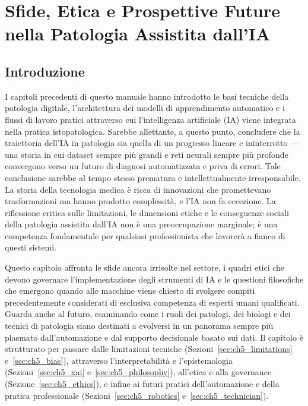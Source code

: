 
\chapter{Sfide, Etica e Prospettive Future nella Patologia Assistita dall'IA}
\label{ch:5}

\section{Introduzione}

I capitoli precedenti di questo manuale hanno introdotto le basi tecniche della patologia digitale, l'architettura dei modelli di apprendimento automatico e i flussi di lavoro pratici attraverso cui l'intelligenza artificiale (IA) viene integrata nella pratica istopatologica. Sarebbe allettante, a questo punto, concludere che la traiettoria dell'IA in patologia sia quella di un progresso lineare e ininterrotto — una storia in cui dataset sempre più grandi e reti neurali sempre più profonde convergono verso un futuro di diagnosi automatizzata e priva di errori. Tale conclusione sarebbe al tempo stesso prematura e intellettualmente irresponsabile. La storia della tecnologia medica è ricca di innovazioni che promettevano trasformazioni ma hanno prodotto complessità, e l'IA non fa eccezione. La riflessione critica sulle limitazioni, le dimensioni etiche e le conseguenze sociali della patologia assistita dall'IA non è una preoccupazione marginale; è una competenza fondamentale per qualsiasi professionista che lavorerà a fianco di questi sistemi.

Questo capitolo affronta le sfide ancora irrisolte nel settore, i quadri etici che devono governare l'implementazione degli strumenti di IA e le questioni filosofiche che emergono quando alle macchine viene chiesto di svolgere compiti precedentemente considerati di esclusiva competenza di esperti umani qualificati. Guarda anche al futuro, esaminando come i ruoli dei patologi, dei biologi e dei tecnici di patologia siano destinati a evolversi in un panorama sempre più plasmato dall'automazione e dal supporto decisionale basato sui dati. Il capitolo è strutturato per passare dalle limitazioni tecniche (Sezioni~\ref{sec:ch5_limitations} e~\ref{sec:ch5_bias}), attraverso l'interpretabilità e l'epistemologia (Sezioni~\ref{sec:ch5_xai} e~\ref{sec:ch5_philosophy}), all'etica e alla governance (Sezione~\ref{sec:ch5_ethics}), e infine ai futuri pratici dell'automazione e della pratica professionale (Sezioni~\ref{sec:ch5_robotics} e~\ref{sec:ch5_technician}).

